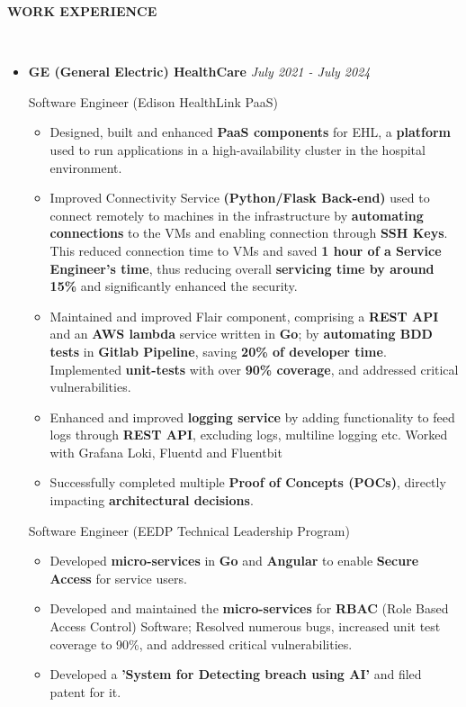 \documentclass[a4paper,10pt]{article}
\newcommand{\isep}{-2 pt}
\newcommand{\lsep}{-0.6cm}
\newcommand{\resheading}[1]{{\small \colorbox{mygrey}{\begin{minipage}{0.975\textwidth}{\textbf{#1 \vphantom{p\^{E}}}}\end{minipage}}}}
\begin{document}
\resheading{\textbf{WORK EXPERIENCE} }\\[\lsep]
\vspace{1.0pt}
\begin{itemize}
\item \textbf{GE (General Electric) HealthCare} \hfill \emph{July 2021 - July 2024}
\setlength{\itemsep}{1pt}
\setlength{\parskip}{0pt}
\setlength{\parsep}{0pt}

Software Engineer (Edison HealthLink PaaS)
\vspace{-2pt}
	\begin{itemize}\itemsep \isep
	\item Designed, built and enhanced \textbf{PaaS components} for EHL, a \textbf{platform} used to run applications in a high-availability cluster in the hospital environment. 
    \item Improved Connectivity Service \textbf{(Python/Flask Back-end)} used to connect remotely to machines in the infrastructure by \textbf{automating connections} to the VMs and enabling connection through \textbf{SSH Keys}. This reduced connection time to VMs and saved \textbf{1 hour of a Service Engineer’s time}, thus reducing overall \textbf{servicing time by around 15\%} and significantly enhanced the security.
     \item Maintained and improved Flair component, comprising a \textbf{REST API} and an \textbf{AWS lambda} service written in \textbf{Go}; by \textbf{automating BDD tests} in \textbf{Gitlab Pipeline}, saving \textbf{20\% of developer time}. Implemented \textbf{unit-tests} with over \textbf{90\% coverage}, and addressed critical vulnerabilities.
    \item Enhanced and improved \textbf{logging service} by adding functionality to feed logs through \textbf{REST API}, excluding logs, multiline logging etc. Worked with Grafana Loki, Fluentd and Fluentbit
    \item Successfully completed multiple \textbf{Proof of Concepts (POCs)}, directly impacting \textbf{architectural decisions}.
	\end{itemize}
\vspace{-2pt}

Software Engineer (EEDP Technical Leadership Program)
\vspace{-2pt}
	\begin{itemize}\itemsep \isep
	\item Developed \textbf{micro-services} in \textbf{Go} and \textbf{Angular} to enable \textbf{Secure Access} for service users.
    \item Developed and maintained the \textbf{micro-services} for \textbf{RBAC} (Role Based Access Control) Software; Resolved numerous bugs, increased unit test coverage to 90\%, and addressed critical vulnerabilities.
	\item  Developed a \textbf{'System for Detecting breach using AI'} and filed patent for it.
	\end{itemize}
\vspace{-2pt}


\end{itemize}
\end{document}
